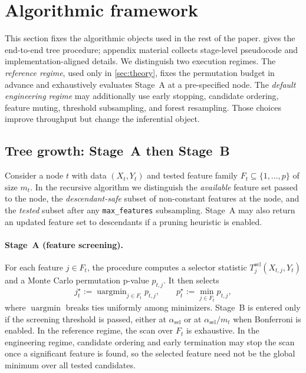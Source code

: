 \section{Algorithmic framework}
\label{sec:method}

This section fixes the algorithmic objects used in the rest of the paper.
 gives the end-to-end tree procedure; appendix material
collects stage-level pseudocode and implementation-aligned details. We
distinguish two execution regimes. The \emph{reference regime}, used only in
\cref{sec:theory}, fixes the permutation budget in advance and exhaustively
evaluates Stage~A at a pre-specified node. The \emph{default engineering
regime} may additionally use early stopping, candidate ordering, feature
muting, threshold subsampling, and forest resampling. Those choices improve
throughput but change the inferential object.

\subsection{Tree growth: Stage~A then Stage~B}
\label{sec:stageA-stageB}

Consider a node $t$ with data $(X_t, Y_t)$ and tested feature family
$F_t \subseteq \{1,\dots,p\}$ of size $m_t$. In the recursive algorithm we
distinguish the \emph{available} feature set passed to the node, the
\emph{descendant-safe} subset of non-constant features at the node, and the
\emph{tested} subset after any \texttt{max\_features} subsampling. Stage~A may
also return an updated feature set to descendants if a pruning heuristic is
enabled.

\paragraph{Stage~A (feature screening).}
For each feature $j \in F_t$, the procedure computes a selector statistic
$T^{\mathrm{sel}}_j(X_{t,j}, Y_t)$ and a Monte Carlo permutation p-value
$p_{t,j}$. It then selects
%
\begin{equation}
  j_t^\star := \operatorname{uargmin}_{j \in F_t} p_{t,j}, \qquad
  p_t^\star := \min_{j \in F_t} p_{t,j},
\end{equation}
%
where $\operatorname{uargmin}$ breaks ties uniformly among minimizers. Stage~B
is entered only if the screening threshold is passed, either at
$\alpha_{\mathrm{sel}}$ or at $\alpha_{\mathrm{sel}}/m_t$ when Bonferroni is
enabled. In the reference regime, the scan over $F_t$ is exhaustive. In the
engineering regime, candidate ordering and early termination may stop the scan
once a significant feature is found, so the selected feature need not be the
global minimum over all tested candidates.

